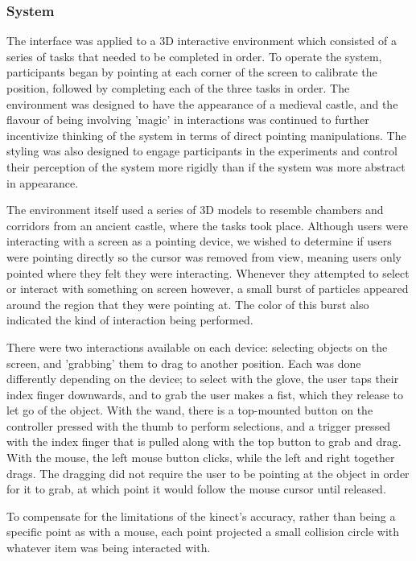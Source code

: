 \subsubsection{System}

The interface was applied to a 3D interactive environment which consisted of a series of tasks that needed to be completed in order. To operate the system, participants began by pointing at each corner of the screen to calibrate the position, followed by completing each of the three tasks in order. The environment was designed to have the appearance of a medieval castle, and the flavour of being involving 'magic' in interactions was continued to further incentivize thinking of the system in terms of direct pointing manipulations. The styling was also designed to engage participants in the experiments and control their perception of the system more rigidly than if the system was more abstract in appearance.

The environment itself used a series of 3D models to resemble chambers and corridors from an ancient castle, where the tasks took place. Although users were interacting with a screen as a pointing device, we wished to determine if users were pointing directly so the cursor was removed from view, meaning users only pointed where they felt they were interacting. Whenever they attempted to select or interact with something on screen however, a small burst of particles appeared around the region that they were pointing at. The color of this burst also indicated the kind of interaction being performed.

There were two interactions available on each device: selecting objects on the screen, and 'grabbing' them to drag to another position. Each was done differently depending on the device; to select with the glove, the user taps their index finger downwards, and to grab the user makes a fist, which they release to let go of the object. With the wand, there is a top-mounted button on the controller pressed with the thumb to perform selections, and a trigger pressed with the index finger that is pulled along with the top button to grab and drag. With the mouse, the left mouse button clicks, while the left and right together drags. The dragging did not require the user to be pointing at the object in order for it to grab, at which point it would follow the mouse cursor until released.

To compensate for the limitations of the kinect's accuracy, rather than being a specific point as with a mouse, each point projected a small collision circle with whatever item was being interacted with.

